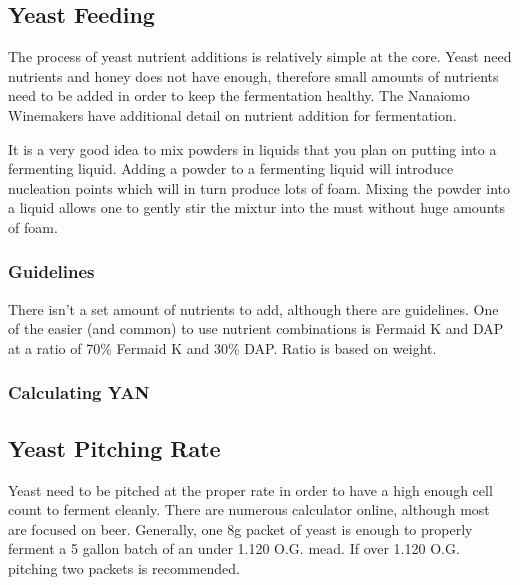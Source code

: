 
 \subsection{Yeast Feeding}
  The process of yeast nutrient additions is relatively simple at the core. Yeast need nutrients and honey does 
  not have enough, therefore small amounts of nutrients need to be added in order to keep the fermentation healthy. 
  The Nanaiomo Winemakers have additional detail on nutrient addition for fermentation\cite{nanaiomo-fermentation}. 

  It is a very good idea to mix powders in liquids that you plan on putting into a fermenting liquid. 
  Adding a powder to a fermenting liquid will introduce nucleation points which will in turn produce lots of foam. 
  Mixing the powder into a liquid allows one to gently stir the mixtur into the must without huge amounts of foam.
  \subsubsection{Guidelines}
   There isn't a set amount of nutrients to add, although there are guidelines. One of the easier (and common) to 
   use nutrient combinations is Fermaid K and DAP at a ratio of 70\% Fermaid K and 30\% 
   DAP\cite{gotmead-fermaid-ratio}. Ratio is based on weight. 

  \subsubsection{Calculating YAN}

 \subsection{Yeast Pitching Rate}
  Yeast need to be pitched at the proper rate in order to have a high enough cell count to ferment cleanly. 
  There are numerous calculator online, although most
  are focused on beer. Generally, one 8g packet of yeast is enough to properly ferment a 5 gallon batch of an 
  under 1.120 O.G. mead. If over 1.120 O.G. pitching two packets is recommended. 

